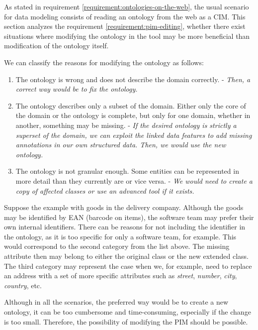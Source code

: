 As stated in requirement \ref{requirement:ontologies-on-the-web}, the usual scenario for data modeling consists of reading an ontology from the web as a CIM. This section analyzes the requirement \ref{requirement:pim-editing}, whether there exist situations where modifying the ontology in the tool may be more beneficial than modification of the ontology itself.

We can classify the reasons for modifying the ontology as follows:

\begin{enumerate}
    \item The ontology is wrong and does not describe the domain correctly. - \textit{Then, a correct way would be to fix the ontology.}
    \item The ontology describes only a subset of the domain. Either only the core of the domain or the ontology is complete, but only for one domain, whether in another, something may be missing. - \textit{If the desired ontology is strictly a superset of the domain, we can exploit the linked data features to add missing annotations in our own structured data. Then, we would use the new ontology.}
    \item The ontology is not granular enough. Some entities can be represented in more detail than they currently are or vice versa. - \textit{We would need to create a copy of affected classes or use an advanced tool if it exists.}
\end{enumerate}

Suppose the example with goods in the delivery company. Although the goods may be identified by EAN (barcode on items), the software team may prefer their own internal identifiers. There can be reasons for not including the identifier in the ontology, as it is too specific for only a software team, for example. This would correspond to the second category from the list above. The missing attribute then may belong to either the original class or the new extended class. The third category may represent the case when we, for example, need to replace an address with a set of more specific attributes such as \textit{street}, \textit{number}, \textit{city}, \textit{country}, etc.

Although in all the scenarios, the preferred way would be to create a new ontology, it can be too cumbersome and time-consuming, especially if the change is too small. Therefore, the possibility of modifying the PIM should be possible.

\smallskip

